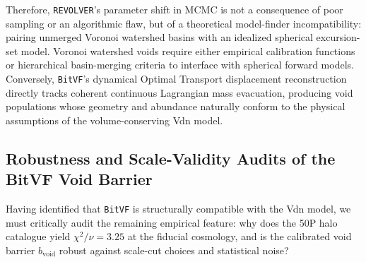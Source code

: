 \documentclass[12pt]{report}
\begin{document}
Therefore, \texttt{REVOLVER}'s parameter shift in MCMC is not a consequence of poor sampling or an algorithmic flaw, but of a theoretical model-finder incompatibility: pairing unmerged Voronoi watershed basins with an idealized spherical excursion-set model. Voronoi watershed voids require either empirical calibration functions or hierarchical basin-merging criteria \citep{Nadathur2015a} to interface with spherical forward models. Conversely, \texttt{BitVF}'s dynamical Optimal Transport displacement reconstruction directly tracks coherent continuous Lagrangian mass evacuation, producing void populations whose geometry and abundance naturally conform to the physical assumptions of the volume-conserving Vdn model.

\subsection{Robustness and Scale-Validity Audits of the BitVF Void Barrier}
\label{sec:bitvf_robustness_audits}

Having identified that \texttt{BitVF} is structurally compatible with the Vdn model, we must critically audit the remaining empirical feature: why does the 50P halo catalogue yield $\chi^2/\nu = 3.25$ at the fiducial cosmology, and is the calibrated void barrier $b_{\mathrm{void}}$ robust against scale-cut choices and statistical noise?
\end{document}
